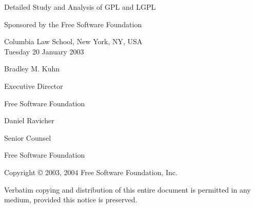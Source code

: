 \documentclass[12pt]{report}
\begin{document}
\begin{titlepage}


\begin{center}

\vspace{.5in}

{\Large
{\sc Detailed Study and Analysis of GPL and LGPL  } \\

\vspace{.7in}

Sponsored by the Free Software Foundation \\


\vspace{.3in}

Columbia Law School, New York, NY, USA \\
\vspace{.1in}
Tuesday 20 January 2003 
}

\vspace{.7in}

{\large
Bradley M. Kuhn

Executive Director

Free Software Foundation
}

\vspace{.3in}


{\large
Daniel Ravicher

Senior Counsel 

Free Software Foundation
}

\end{center}

\vfill

{\parindent 0in
Copyright \copyright{} 2003, 2004 \hspace{.2in} Free Software Foundation, Inc.

\vspace{.3in}

Verbatim copying and distribution of this entire document is permitted in
any medium, provided this notice is preserved.
}

\end{titlepage}

\pagestyle{plain}
\end{document}
